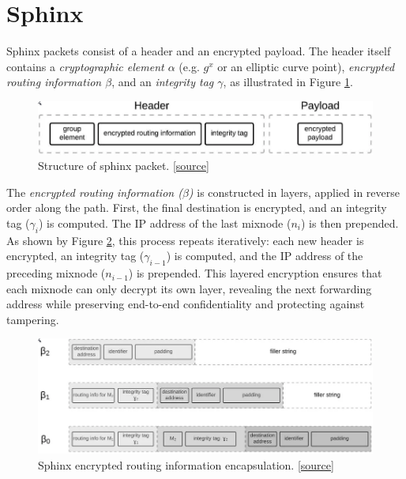 \section{Sphinx}\label{sec:sphinx}

Sphinx packets consist of a header and an encrypted payload. 
The header itself contains a \textit{cryptographic element $\alpha$} (e.g. $g^x$ or an elliptic curve point), \textit{encrypted routing information $\beta$}, and an \textit{integrity tag $\gamma$}, as illustrated in Figure \ref{fig:sphinx_structure}.

\begin{figure}[h]
    \centering
    \includegraphics[width=0.9\linewidth]{Images/sphinx_structure.png}
    \caption{Structure of sphinx packet. \href{https://blog.nymtech.net/sphinx-tl-dr-the-data-packet-that-can-anonymize-bitcoin-and-the-internet-18d152c6e4dc}{[source]}}
    \label{fig:sphinx_structure}
\end{figure}

The \textit{encrypted routing information ($\beta$)} is constructed in layers, applied in reverse order along the path.
First, the final destination is encrypted, and an integrity tag ($\gamma_i$) is computed. 
The IP address of the last mixnode ($n_i$) is then prepended.
As shown by Figure \ref{fig:sphinx_header}, this process repeats iteratively: each new header is encrypted, an integrity tag ($\gamma_{i-1}$) is computed, and the IP address of the preceding mixnode ($n_{i-1}$) is prepended.
This layered encryption ensures that each mixnode can only decrypt its own layer, revealing the next forwarding address while preserving end-to-end confidentiality and protecting against tampering.

\begin{figure}[h]
    \centering
    \includegraphics[width=\linewidth]{Images/sphinx_header.png}
    \caption{Sphinx encrypted routing information encapsulation. \href{https://blog.nymtech.net/sphinx-tl-dr-the-data-packet-that-can-anonymize-bitcoin-and-the-internet-18d152c6e4dc}{[source]}}
    \label{fig:sphinx_header}
\end{figure}

